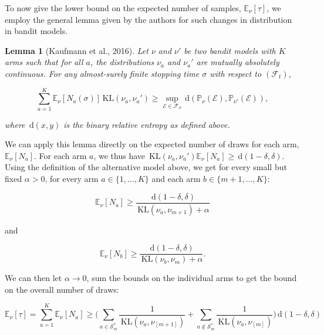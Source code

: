 \documentclass[12pt,]{article}
\newtheorem{lemma}{Lemma}
\newcommand{\KL}{\,\text{KL}}
\newcommand{\der}{\,\text{d}}
\begin{document}
To now give the lower bound on the expected number of samples,
\(\mathbb{E}_{\nu}[\tau]\), we employ the general lemma given by the
authors for such changes in distribution in bandit models.

\begin{lemma}[Kaufmann et al., 2016] \label{theorem:KaufmannEtAlLemma1}
Let $\nu$ and $\nu'$ be two bandit models with $K$ arms such that for all $a$, the distributions $\nu_a$ and $\nu_a'$ are mutually absolutely continuous. For any almost-surely finite stopping time $\sigma$ with respect to $(\mathcal{F}_t)$,

\begin{equation*}
\sum_{a=1}^{K} \mathbb{E}_{\nu} [N_a(\sigma)] \KL(\nu_a, \nu_a') \geq \sup_{\mathcal{E} \in \mathcal{F}_{\sigma}} \der (\mathbb{P}_{\nu}(\mathcal{E}), \mathbb{P}_{\nu'}(\mathcal{E})),
\end{equation*}

where $\der(x,y)$ is the binary relative entropy as defined above.
\end{lemma}

We can apply this lemma directly on the expected number of draws for
each arm, \(\mathbb{E}_{\nu}[N_a]\). For each arm \(a\), we thus have
\(\KL(\nu_a, \nu_a') \mathbb{E}_{\nu}[N_a] \geq \der (1-\delta, \delta)\).
Using the definition of the alternative model above, we get for every
small but fixed \(\alpha > 0\), for every arm \(a \in \{1, \dots, K\}\)
and each arm \(b \in \{m+1, \dots, K\}\):

\begin{equation*}
\mathbb{E}_{\nu}[N_a] \geq \frac{\der(1-\delta, \delta)}{\KL (\nu_a, \nu_{m+1}) + \alpha}
\end{equation*}

and

\begin{equation*}
\mathbb{E}_{\nu}[N_b] \geq \frac{\der(1-\delta, \delta)}{\KL (\nu_b, \nu_{m}) + \alpha}.
\end{equation*}

We can then let \(\alpha \to 0\), sum the bounds on the individual arms
to get the bound on the overall number of draws:

\begin{equation*}
\mathbb{E}_{\nu}[\tau] = \sum_{a=1}^K \mathbb{E}_{\nu}[N_a] \geq \Big( \sum_{a \in \mathcal{S}_m^*} \frac{1}{\KL(\nu_a, \nu_{[m+1]})} + \sum_{a \notin \mathcal{S}_m^*} \frac{1}{\KL(\nu_a, \nu_{[m]})} \Big) \der(1-\delta, \delta)
\end{equation*}
\end{document}

